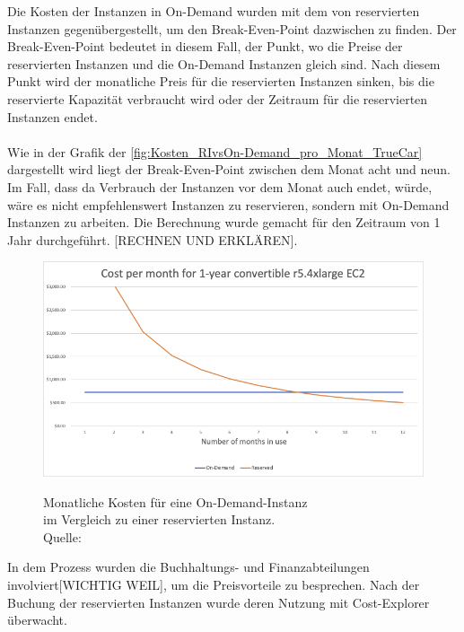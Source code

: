 Die Kosten der Instanzen in On-Demand wurden mit dem von reservierten Instanzen gegenübergestellt, um den Break-Even-Point dazwischen zu finden. Der Break-Even-Point bedeutet in diesem Fall, der Punkt, wo die Preise der reservierten Instanzen und die On-Demand Instanzen gleich sind. Nach diesem Punkt wird der monatliche Preis für die reservierten Instanzen sinken, bis die reservierte Kapazität verbraucht wird oder der Zeitraum für die reservierten Instanzen endet.
\\\\
Wie in der Grafik der \autoref{fig:Kosten_RIvsOn-Demand_pro_Monat_TrueCar} dargestellt wird liegt der Break-Even-Point zwischen dem Monat acht und neun. Im Fall, dass da Verbrauch der Instanzen vor dem Monat auch endet, würde, wäre es nicht empfehlenswert Instanzen zu reservieren, sondern mit On-Demand Instanzen zu arbeiten. Die Berechnung wurde gemacht für den Zeitraum von 1 Jahr durchgeführt. [RECHNEN UND ERKLÄREN]. 
\begin{figure}[h!]
  \centering
  \includegraphics[scale=0.6]{sources/Kosten_RIvsOn-Demand_pro_Monat_TrueCar}\label{fig:Kosten_RIvsOn-Demand_pro_Monat_TrueCar}\\
  \caption[Monatliche Kosten für eine On-Demand-Instanz im Vergleich zu einer reservierten Instanz]{}
  \label{fig:Kosten_RIvsOn-Demand_pro_Monat_TrueCar}Monatliche Kosten für eine On-Demand-Instanz\\ im Vergleich zu einer reservierten Instanz.\\
  Quelle: {\cite{MED1}}
\end{figure}
In dem Prozess wurden die Buchhaltungs- und Finanzabteilungen involviert[WICHTIG WEIL], um die Preisvorteile zu besprechen. Nach der Buchung der reservierten Instanzen wurde deren Nutzung mit Cost-Explorer überwacht. 
\\\\
